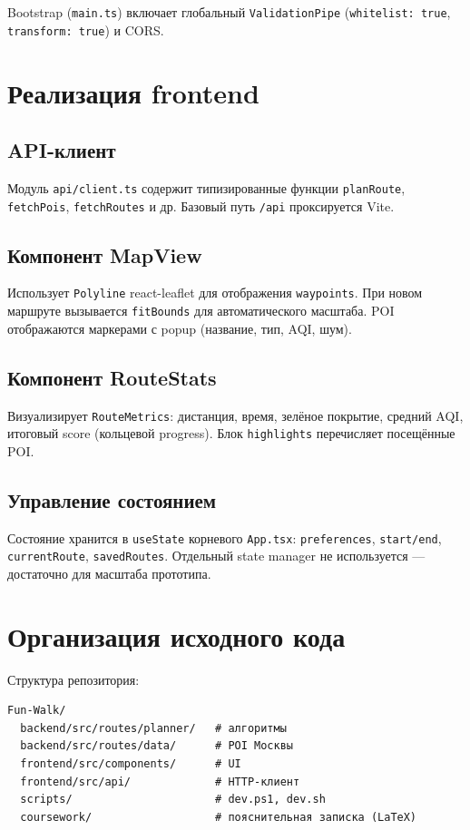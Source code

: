 Bootstrap (\texttt{main.ts}) включает глобальный \texttt{ValidationPipe}
(\texttt{whitelist: true}, \texttt{transform: true}) и CORS.

\section{Реализация frontend}

\subsection{API-клиент}

Модуль \texttt{api/client.ts} содержит типизированные функции
\texttt{planRoute}, \texttt{fetchPois}, \texttt{fetchRoutes} и др.
Базовый путь \texttt{/api} проксируется Vite.

\subsection{Компонент MapView}

Использует \texttt{Polyline} react-leaflet для отображения \texttt{waypoints}.
При новом маршруте вызывается \texttt{fitBounds} для автоматического масштаба.
POI отображаются маркерами с popup (название, тип, AQI, шум).

\subsection{Компонент RouteStats}

Визуализирует \texttt{RouteMetrics}: дистанция, время, зелёное покрытие,
средний AQI, итоговый score (кольцевой progress). Блок \texttt{highlights}
перечисляет посещённые POI.

\subsection{Управление состоянием}

Состояние хранится в \texttt{useState} корневого \texttt{App.tsx}:
\texttt{preferences}, \texttt{start/end}, \texttt{currentRoute}, \texttt{savedRoutes}.
Отдельный state manager не используется --- достаточно для масштаба прототипа.

\section{Организация исходного кода}

Структура репозитория:
\begin{verbatim}
Fun-Walk/
  backend/src/routes/planner/   # алгоритмы
  backend/src/routes/data/      # POI Москвы
  frontend/src/components/      # UI
  frontend/src/api/             # HTTP-клиент
  scripts/                      # dev.ps1, dev.sh
  coursework/                   # пояснительная записка (LaTeX)
\end{verbatim}

